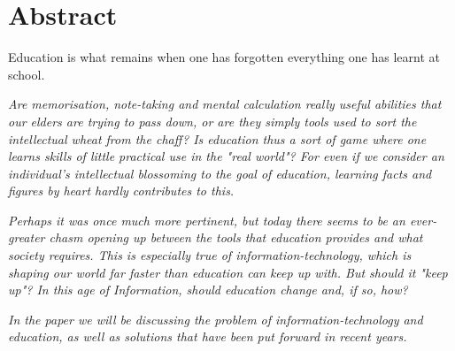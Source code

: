 
\chapter*{Abstract}\label{abstract}

\begin{coolquote}
\Large Education is what remains when one has forgotten everything one has learnt at school.
\end{coolquote}

\textit{Are memorisation, note-taking and mental calculation really useful abilities that our elders are trying to pass down, or are they simply tools used to sort the intellectual wheat from the chaff? Is education thus a sort of game where one learns skills of little practical use in the "real world"? For even if we consider an individual's intellectual blossoming to the goal of education, learning facts and figures by heart hardly contributes to this.}

\textit{Perhaps it was once much more pertinent, but today there seems to be an ever-greater chasm opening up between the tools that education provides and what society requires. This is especially true of information-technology, which is shaping our world far faster than education can keep up with. But should it "keep up"? In this age of Information, should education change and, if so, how?}

\textit{In the paper we will be discussing the problem of information-technology and education, as well as solutions that have been put forward in recent years.}